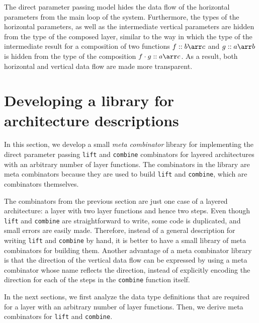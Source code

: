 The direct parameter passing model hides the data flow of the horizontal parameters from the main loop of the system. Furthermore, the types of the horizontal parameters, as well as the intermediate vertical parameters are hidden from the type of the composed layer, similar to the way in which the type of the intermediate result for a composition of two functions $f :: b \arr c$ and $g :: a \arr b$ is hidden from the type of the composition $f \cdot g :: a \arr c$. As a result, both horizontal and vertical data flow are made more transparent.   


%																
%																
%																
\section{Developing a library for architecture descriptions} \label{sectlib}

In this section, we develop a small {\em meta combinator} library for implementing the direct parameter passing \texttt{lift} and \texttt{combine} combinators for layered architectures with an arbitrary number of layer functions. The combinators in the library are meta combinators because they are used to build \texttt{lift} and \texttt{combine}, which are combinators themselves.

The combinators from the previous section are just one case of a layered architecture: a layer with two layer functions and hence two steps. Even though \texttt{lift} and \texttt{combine} are straightforward to write, some code is duplicated, and small errors are easily made. Therefore, instead of a general description for writing \texttt{lift} and \texttt{combine} by hand, it is better to have a small library of meta combinators for building them. Another advantage of a meta combinator library is that the direction of the vertical data flow can be expressed by using a meta combinator whose name reflects the direction, instead of explicitly encoding the direction for each of the steps in the \texttt{combine} function itself.

In the next sections, we first analyze the data type definitions that are required for a layer with an arbitrary number of layer functions. Then, we derive meta combinators for \texttt{lift} and \texttt{combine}. 

